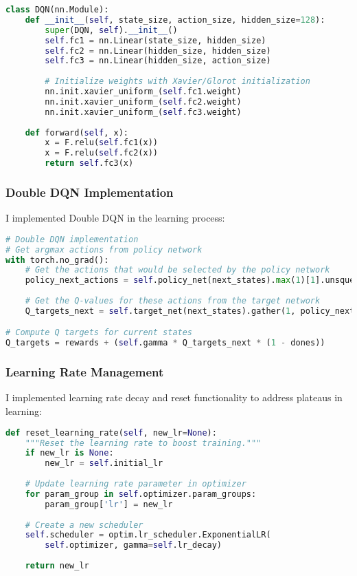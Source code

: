 \documentclass[11pt,a4paper]{article}
\begin{document}
\begin{lstlisting}[language=Python, caption=DQN Network Architecture]
class DQN(nn.Module):
    def __init__(self, state_size, action_size, hidden_size=128):
        super(DQN, self).__init__()
        self.fc1 = nn.Linear(state_size, hidden_size)
        self.fc2 = nn.Linear(hidden_size, hidden_size)
        self.fc3 = nn.Linear(hidden_size, action_size)
        
        # Initialize weights with Xavier/Glorot initialization
        nn.init.xavier_uniform_(self.fc1.weight)
        nn.init.xavier_uniform_(self.fc2.weight)
        nn.init.xavier_uniform_(self.fc3.weight)
    
    def forward(self, x):
        x = F.relu(self.fc1(x))
        x = F.relu(self.fc2(x))
        return self.fc3(x)
\end{lstlisting}

\subsubsection{Double DQN Implementation}
I implemented Double DQN in the learning process:

\begin{lstlisting}[language=Python, caption=Double DQN Implementation]
# Double DQN implementation
# Get argmax actions from policy network
with torch.no_grad():
    # Get the actions that would be selected by the policy network
    policy_next_actions = self.policy_net(next_states).max(1)[1].unsqueeze(1)
    
    # Get the Q-values for these actions from the target network
    Q_targets_next = self.target_net(next_states).gather(1, policy_next_actions)

# Compute Q targets for current states
Q_targets = rewards + (self.gamma * Q_targets_next * (1 - dones))
\end{lstlisting}

\subsubsection{Learning Rate Management}
I implemented learning rate decay and reset functionality to address plateaus in learning:

\begin{lstlisting}[language=Python, caption=Learning Rate Management]
def reset_learning_rate(self, new_lr=None):
    """Reset the learning rate to boost training."""
    if new_lr is None:
        new_lr = self.initial_lr
        
    # Update learning rate parameter in optimizer
    for param_group in self.optimizer.param_groups:
        param_group['lr'] = new_lr
        
    # Create a new scheduler
    self.scheduler = optim.lr_scheduler.ExponentialLR(
        self.optimizer, gamma=self.lr_decay)
    
    return new_lr
\end{lstlisting}
\end{document}
